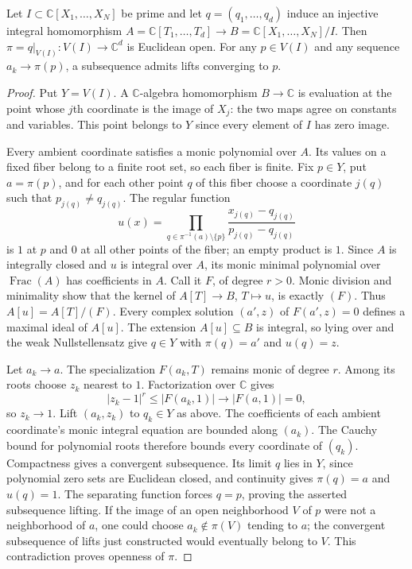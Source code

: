 \begin{lemma}
\label{lem:complex-closure-normalization-open}
\leanok
Let $I\subset\mathbb C[X_1,\ldots,X_N]$ be prime and let
$q=(q_1,\ldots,q_d)$ induce an injective integral homomorphism
$A=\mathbb C[T_1,\ldots,T_d]\to B=\mathbb C[X_1,\ldots,X_N]/I$.
Then $\pi=q|_{V(I)}:V(I)\to\mathbb C^d$ is Euclidean open.
For any $p\in V(I)$ and any sequence $a_k\to\pi(p)$, a subsequence
admits lifts converging to $p$.
\end{lemma}
\begin{proof}
Put $Y=V(I)$. A $\mathbb C$-algebra homomorphism $B\to\mathbb C$
is evaluation at the point whose $j$th coordinate is the image of $X_j$:
the two maps agree on constants and variables. This point belongs to $Y$
since every element of $I$ has zero image.

Every ambient coordinate satisfies a monic polynomial over $A$. Its values
on a fixed fiber belong to a finite root set, so each fiber is finite.
Fix $p\in Y$, put $a=\pi(p)$, and for each other point $q$ of this fiber
choose a coordinate $j(q)$ such that $p_{j(q)}\ne q_{j(q)}$. The regular function
\[
 u(x)=\prod_{q\in\pi^{-1}(a)\setminus\{p\}}
 \frac{x_{j(q)}-q_{j(q)}}{p_{j(q)}-q_{j(q)}}
\]
is $1$ at $p$ and $0$ at all other points of the fiber; an empty product
is $1$. Since $A$ is integrally closed and $u$ is integral over $A$, its
monic minimal polynomial over $\operatorname{Frac}(A)$ has coefficients in
$A$. Call it $F$, of degree $r>0$. Monic division and minimality show
that the kernel of $A[T]\to B$, $T\mapsto u$, is exactly $(F)$.
Thus $A[u]=A[T]/(F)$. Every complex solution $(a',z)$ of $F(a',z)=0$
defines a maximal ideal of $A[u]$. The extension $A[u]\subseteq B$ is
integral, so lying over and the weak Nullstellensatz give $q\in Y$
with $\pi(q)=a'$ and $u(q)=z$.

Let $a_k\to a$. The specialization $F(a_k,T)$ remains monic of degree
$r$. Among its roots choose $z_k$ nearest to $1$. Factorization over
$\mathbb C$ gives
\[
 |z_k-1|^r\leq |F(a_k,1)|\longrightarrow |F(a,1)|=0,
\]
so $z_k\to1$. Lift $(a_k,z_k)$ to $q_k\in Y$ as above. The
coefficients of each ambient coordinate's monic integral equation are
bounded along $(a_k)$. The Cauchy bound for polynomial roots therefore
bounds every coordinate of $(q_k)$. Compactness gives a convergent
subsequence. Its limit $q$ lies in $Y$, since polynomial zero
sets are Euclidean closed, and continuity gives $\pi(q)=a$ and $u(q)=1$.
The separating function forces $q=p$, proving the asserted subsequence lifting.
If the image of an open neighborhood $V$ of $p$ were not a neighborhood
of $a$, one could choose $a_k\notin\pi(V)$ tending to $a$; the convergent
subsequence of lifts just constructed would eventually belong to $V$. This contradiction
proves openness of $\pi$.
\end{proof}

